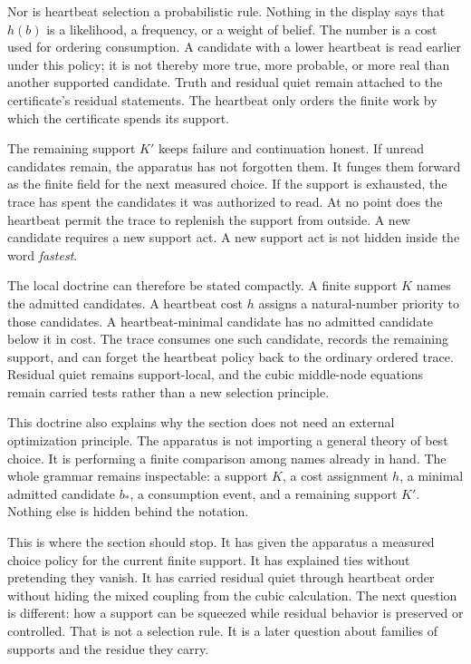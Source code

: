Nor is heartbeat selection a probabilistic rule. Nothing in the display says
that \(h(b)\) is a likelihood, a frequency, or a weight of belief. The number
is a cost used for ordering consumption. A candidate with a lower heartbeat is
read earlier under this policy; it is not thereby more true, more probable, or
more real than another supported candidate. Truth and residual quiet remain
attached to the certificate's residual statements. The heartbeat only orders
the finite work by which the certificate spends its support.

The remaining support \(K'\) keeps failure and continuation honest. If unread candidates remain, the apparatus has not forgotten them. It funges them forward as the finite field for the next measured choice. If the support
is exhausted, the trace has spent the candidates it was authorized to read.
At no point does the heartbeat permit the trace to replenish the support from
outside. A new candidate requires a new support act. A new support act is not hidden inside the word \emph{fastest}.

The local doctrine can therefore be stated compactly. A finite support \(K\)
names the admitted candidates. A heartbeat cost \(h\) assigns a natural-number
priority to those candidates. A heartbeat-minimal candidate has no admitted
candidate below it in cost. The trace consumes one such candidate, records the
remaining support, and can forget the heartbeat policy back to the ordinary
ordered trace. Residual quiet remains support-local, and the cubic middle-node
equations remain carried tests rather than a new selection principle.

This doctrine also explains why the section does not need an external
optimization principle. The apparatus is not importing a general theory of best choice. It is performing a finite comparison among names already in hand.
The whole grammar remains inspectable: a support \(K\), a cost assignment
\(h\), a minimal admitted candidate \(b_\ast\), a consumption event, and a
remaining support \(K'\). Nothing else is hidden behind the notation.

This is where the section should stop. It has given the apparatus a measured
choice policy for the current finite support. It has explained ties without
pretending they vanish. It has carried residual quiet through heartbeat order
without hiding the mixed coupling from the cubic calculation. The next question is different: how a support can be squeezed while residual behavior is preserved or controlled. That is not a selection rule. It is a later question about families of supports and the residue they carry.

